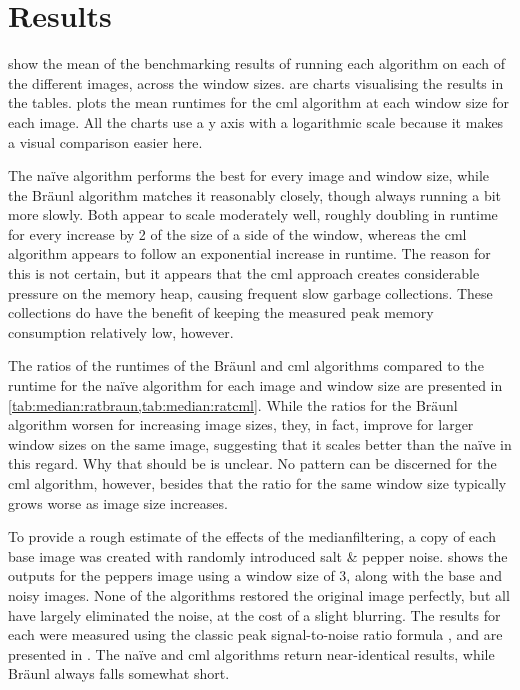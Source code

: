 \section{Results}

 show the mean of the benchmarking results of running each algorithm on each of the different images, across the window sizes.   are charts visualising the results in the tables.   plots the mean runtimes for the \gls{cml} algorithm at each window size for each image.  All the charts use a y axis with a logarithmic scale because it makes a visual comparison easier here.

The naïve algorithm performs the best for every image and window size, while the Bräunl algorithm matches it reasonably closely, though always running a bit more slowly.  Both appear to scale moderately well, roughly doubling in runtime for every increase by 2 of the size of a side of the window, whereas the \gls{cml} algorithm appears to follow an exponential increase in runtime.  The reason for this is not certain, but it appears that the \gls{cml} approach creates considerable pressure on the memory heap, causing frequent slow garbage collections.  These collections do have the benefit of keeping the measured peak memory consumption relatively low, however.

The ratios of the runtimes of the Bräunl and \gls{cml} algorithms compared to the runtime for the naïve algorithm for each image and window size are presented in \cref{tab:median:ratbraun,tab:median:ratcml}.  While the ratios for the Bräunl algorithm worsen for increasing image sizes, they, in fact, improve for larger window sizes on the same image, suggesting that it scales better than the naïve in this regard.  Why that should be is unclear.  No pattern can be discerned for the \gls{cml} algorithm, however, besides that the ratio for the same window size typically grows worse as image size increases.

To provide a rough estimate of the effects of the \gls{medianfilter}ing, a copy of each base image was created with randomly introduced salt \& pepper noise.   shows the outputs for the peppers image using a window size of 3, along with the base and noisy images.  None of the algorithms restored the original image perfectly, but all have largely eliminated the noise, at the cost of a slight blurring.  The results for each were measured using the classic peak signal-to-noise ratio formula \cite{Boncelet2005}, and are presented in .  The naïve and \gls{cml} algorithms return near-identical results, while Bräunl always falls somewhat short.

